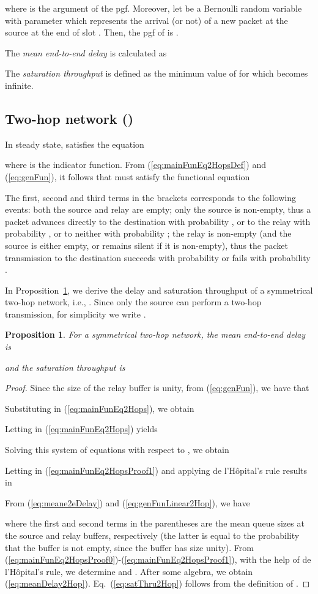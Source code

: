 \documentclass[draftclsnofoot,10pt,onecolumn,letterpaper]{IEEEtran}
\newtheorem{propos}{Proposition}
\begin{document}
where  is the argument of the pgf. 
Moreover, let  be a Bernoulli random variable with parameter  which represents the arrival (or not)
of a new packet at the source at the end of slot . Then, the pgf of  is .

The {\em mean end-to-end delay} is calculated as~\cite{Sidi87}

The {\em saturation throughput}  is defined as the minimum value of  for which  becomes infinite.

\subsection{Two-hop network ()}

In steady state,  satisfies the equation

where  is the indicator function. From (\ref{eq:mainFunEq2HopsDef}) and (\ref{eq:genFun}),
it follows that  must satisfy the functional equation

The first, second and third terms in the brackets corresponds to the following events: both the source and relay are empty; only the 
source is non-empty, thus a packet advances directly to the destination with probability , or to the relay with probability , or
to neither with probability ; the relay is non-empty (and the source is either empty, or remains silent if it is non-empty), thus the packet
transmission to the destination succeeds with probability  or fails with probability .

In Proposition~\ref{prop:delay2Hop}, we derive the delay and saturation throughput of a symmetrical two-hop network, i.e., .
Since only the source can perform a two-hop transmission, for simplicity we write . 

\begin{propos}
 \label{prop:delay2Hop}
For a symmetrical two-hop network, the mean end-to-end delay is

and the saturation throughput is

\end{propos}
\begin{proof}
Since the size of the relay buffer is unity, from (\ref{eq:genFun}), we have that

Substituting in (\ref{eq:mainFunEq2Hops}), we obtain

Letting  in (\ref{eq:mainFunEq2Hops}) yields

Solving this system of equations with respect to , we obtain

Letting  in (\ref{eq:mainFunEq2HopsProof1}) and applying de l'H\^{o}pital's rule results in

From (\ref{eq:meane2eDelay}) and (\ref{eq:genFunLinear2Hop}), we have

where the first and second terms in the parentheses are the mean queue sizes at the source and relay buffers, respectively (the latter is equal to the 
probability that the buffer is not empty, since the buffer has size unity).
From (\ref{eq:mainFunEq2HopsProof0})-(\ref{eq:mainFunEq2HopsProof1}), with the help of de l'H\^{o}pital's rule, we determine 
 and . After some algebra, we obtain (\ref{eq:meanDelay2Hop}).
Eq.~(\ref{eq:satThru2Hop}) follows from the definition of .
\end{proof}
\end{document}
